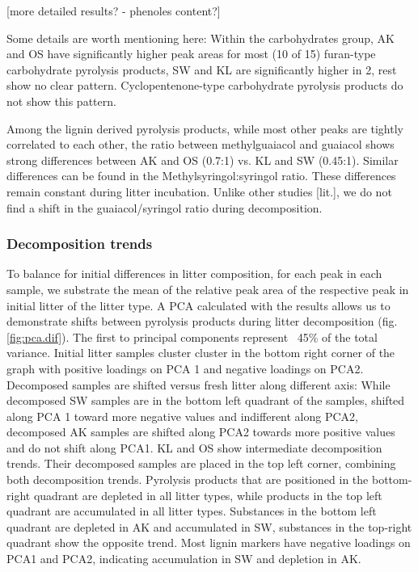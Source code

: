 [more detailed results? - phenoles content?]


Some details are worth mentioning here: Within the carbohydrates group, AK and OS have significantly higher peak areas for most (10 of 15) furan-type carbohydrate pyrolysis products, SW and KL are significantly higher in 2, rest show no clear pattern. Cyclopentenone-type carbohydrate pyrolysis products do not show this pattern. 

Among the lignin derived pyrolysis products, while most other peaks are tightly correlated to each other, the ratio between methylguaiacol and guaiacol shows strong differences between AK and OS (0.7:1) vs. KL and SW (0.45:1). Similar differences can be found in the Methylsyringol:syringol ratio. These differences remain constant during litter incubation. Unlike other studies [lit.], we do not find a shift in the guaiacol/syringol ratio during decomposition.


\subsubsection{Decomposition trends}

To balance for initial differences in litter composition, for each peak in each sample, we substrate the mean of the relative peak area of the respective peak in initial litter of the litter type. A PCA calculated with the results allows us to demonstrate shifts between pyrolysis products during litter decomposition (fig. \ref{fig:pca.dif}). The first to principal components represent ~45\% of the total variance. Initial litter samples cluster cluster in the bottom right corner of the graph with positive loadings on PCA 1 and negative loadings on PCA2. Decomposed samples are shifted versus fresh litter along different axis: While decomposed SW samples are in the bottom left quadrant of the samples, shifted along PCA 1 toward more negative values and indifferent along PCA2, decomposed AK samples are shifted along PCA2 towards more positive values and do not shift along PCA1. KL and OS show intermediate decomposition trends. Their decomposed samples are placed in the top left corner, combining both decomposition trends.  
Pyrolysis products that are positioned in the bottom-right quadrant  are depleted in all litter types, while products in the top left quadrant are accumulated in all litter types. Substances in the bottom left quadrant are depleted in AK and accumulated in SW, substances in the top-right quadrant show the opposite trend. 
Most lignin markers have negative loadings on PCA1 and PCA2, indicating accumulation in SW and depletion in AK. 

